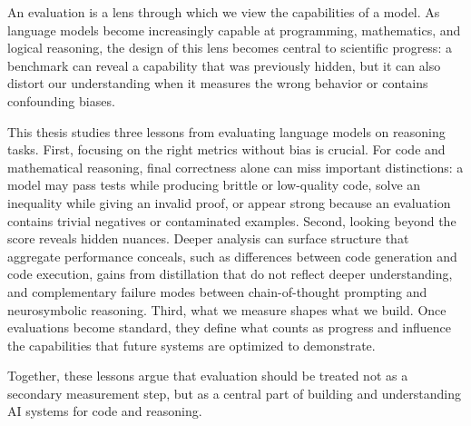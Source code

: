 An evaluation is a lens through which we view the capabilities of a model. As
language models become increasingly capable at programming, mathematics, and
logical reasoning, the design of this lens becomes central to scientific
progress: a benchmark can reveal a capability that was previously hidden, but it
can also distort our understanding when it measures the wrong behavior or
contains confounding biases.

This thesis studies three lessons from evaluating language models on reasoning
tasks. First, focusing on the right metrics without bias is crucial. For code
and mathematical reasoning, final correctness alone can miss important distinctions:
a model may pass tests while producing brittle or low-quality code, solve an
inequality while giving an invalid proof, or appear strong because an evaluation
contains trivial negatives or contaminated examples. Second, looking beyond the score
reveals hidden nuances. Deeper analysis can surface structure that aggregate
performance conceals, such as differences between code generation and code
execution, gains from distillation that do not reflect deeper understanding, and
complementary failure modes between chain-of-thought prompting and neurosymbolic
reasoning.
Third, what we measure shapes what we build. Once evaluations become standard,
they define what counts as progress and influence the capabilities that future
systems are optimized to demonstrate.

Together, these lessons argue that evaluation should be treated not as a
secondary measurement step, but as a central part of building and understanding
AI systems for code and reasoning.
